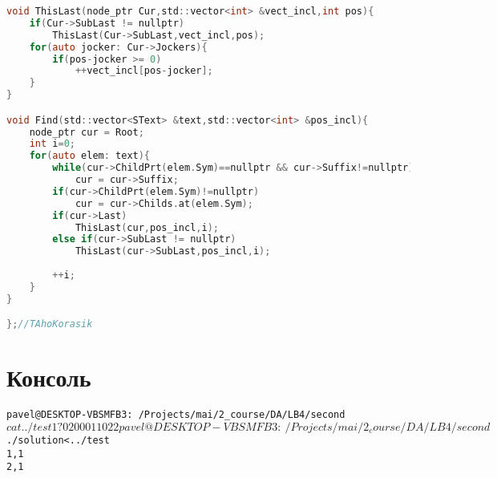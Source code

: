 \begin{lstlisting}[language=C]
void ThisLast(node_ptr Cur,std::vector<int> &vect_incl,int pos){
	if(Cur->SubLast != nullptr)
		ThisLast(Cur->SubLast,vect_incl,pos);
	for(auto jocker: Cur->Jockers){ 
		if(pos-jocker >= 0)
			++vect_incl[pos-jocker];
	}
}

void Find(std::vector<SText> &text,std::vector<int> &pos_incl){
	node_ptr cur = Root;
	int i=0;
	for(auto elem: text){
		while(cur->ChildPrt(elem.Sym)==nullptr && cur->Suffix!=nullptr)
			cur = cur->Suffix;
		if(cur->ChildPrt(elem.Sym)!=nullptr)
			cur = cur->Childs.at(elem.Sym);
		if(cur->Last)
			ThisLast(cur,pos_incl,i);
		else if(cur->SubLast != nullptr)
			ThisLast(cur->SubLast,pos_incl,i);
		
		++i;
	}
}

};//TAhoKorasik
\end{lstlisting}
\pagebreak

\section{Консоль}
\begin{alltt}
pavel@DESKTOP-VBSMFB3:~/Projects/mai/2_course/DA/LB4/second$ cat ../test
1 ? 02
0001
1
02
2
pavel@DESKTOP-VBSMFB3:~/Projects/mai/2_course/DA/LB4/second$ ./solution < ../test
1, 1
2, 1
\end{alltt}
\pagebreak

